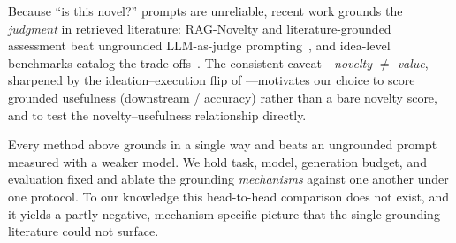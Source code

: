  Because ``is this novel?'' prompts are unreliable, recent
work grounds the \emph{judgment} in retrieved literature: RAG-Novelty and
literature-grounded assessment beat ungrounded LLM-as-judge
prompting~\citep{lin2024schnovel,shahid2025litnovelty}, and idea-level benchmarks
catalog the trade-offs~\citep{guo2024ideabench,liu2025researchbench}. The consistent
caveat---\emph{novelty $\neq$ value}, sharpened by the ideation--execution flip of
\citet{si2024llm}---motivates our choice to score grounded usefulness (downstream
\IND/\OOD{} accuracy) rather than a bare novelty score, and to test the
novelty--usefulness relationship directly.

 Every method above grounds in a single way and beats an
ungrounded prompt measured with a weaker model. We hold task, model, generation
budget, and evaluation fixed and ablate the grounding \emph{mechanisms} against one
another under one protocol. To our knowledge this head-to-head comparison does not
exist, and it yields a partly negative, mechanism-specific picture that the
single-grounding literature could not surface.
